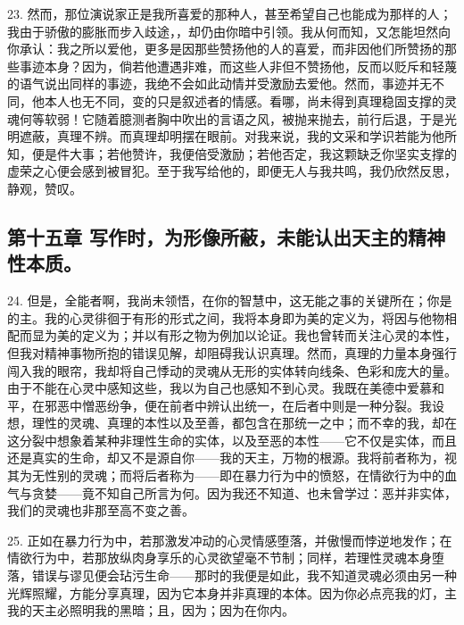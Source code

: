 23. 然而，那位演说家正是我所喜爱的那种人，甚至希望自己也能成为那样的人；我由于骄傲的膨胀而步入歧途，，却仍由你暗中引领。我从何而知，又怎能坦然向你承认：我之所以爱他，更多是因那些赞扬他的人的喜爱，而非因他们所赞扬的那些事迹本身？因为，倘若他遭遇非难，而这些人非但不赞扬他，反而以贬斥和轻蔑的语气说出同样的事迹，我绝不会如此动情并受激励去爱他。然而，事迹并无不同，他本人也无不同，变的只是叙述者的情感。看哪，尚未得到真理稳固支撑的灵魂何等软弱！它随着臆测者胸中吹出的言语之风，被抛来抛去，前行后退，于是光明遮蔽，真理不辨。而真理却明摆在眼前。对我来说，我的文采和学识若能为他所知，便是件大事；若他赞许，我便倍受激励；若他否定，我这颗缺乏你坚实支撑的虚荣之心便会感到被冒犯。至于我写给他的，即便无人与我共鸣，我仍欣然反思，静观，赞叹。\par


\subsection{第十五章 写作时，为形像所蔽，未能认出天主的精神性本质。}

24. 但是，全能者啊，我尚未领悟，在你的智慧中，这无能之事的关键所在；你是的主。我的心灵徘徊于有形的形式之间，我将本身即为美的定义为，将因与他物相配而显为美的定义为；并以有形之物为例加以论证。我也曾转而关注心灵的本性，但我对精神事物所抱的错误见解，却阻碍我认识真理。然而，真理的力量本身强行闯入我的眼帘，我却将自己悸动的灵魂从无形的实体转向线条、色彩和庞大的量。由于不能在心灵中感知这些，我以为自己也感知不到心灵。我既在美德中爱慕和平，在邪恶中憎恶纷争，便在前者中辨认出统一，在后者中则是一种分裂。我设想，理性的灵魂、真理的本性以及至善，都包含在那统一之中；而不幸的我，却在这分裂中想象着某种非理性生命的实体，以及至恶的本性——它不仅是实体，而且还是真实的生命，却又不是源自你——我的天主，万物的根源。我将前者称为，视其为无性别的灵魂；而将后者称为——即在暴力行为中的愤怒，在情欲行为中的血气与贪婪——竟不知自己所言为何。因为我还不知道、也未曾学过：恶并非实体，我们的灵魂也非那至高不变之善。\par

25. 正如在暴力行为中，若那激发冲动的心灵情感堕落，并傲慢而悖逆地发作；在情欲行为中，若那放纵肉身享乐的心灵欲望毫不节制；同样，若理性灵魂本身堕落，错误与谬见便会玷污生命——那时的我便是如此，我不知道灵魂必须由另一种光辉照耀，方能分享真理，因为它本身并非真理的本体。因为你必点亮我的灯，主我的天主必照明我的黑暗；且，因为；因为在你内。\par

